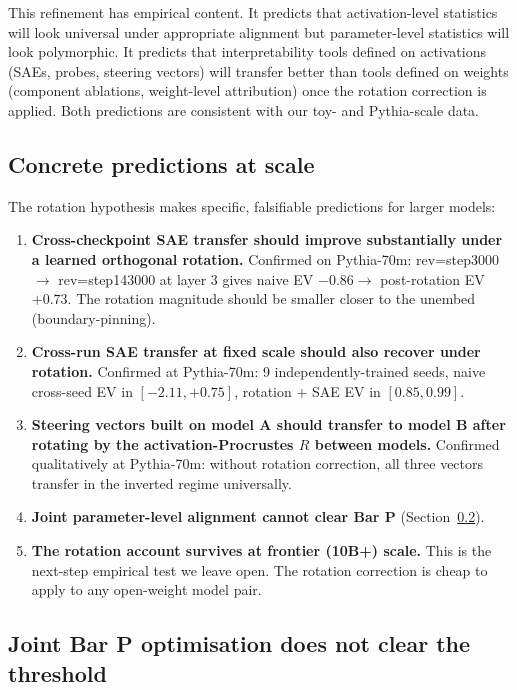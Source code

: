 \documentclass[11pt,letterpaper]{article}
\newcommand{\R}{R}
\begin{document}
This refinement has empirical content. It predicts that activation-level statistics will look universal under appropriate alignment but parameter-level statistics will look polymorphic. It predicts that interpretability tools defined on activations (SAEs, probes, steering vectors) will transfer better than tools defined on weights (component ablations, weight-level attribution) once the rotation correction is applied. Both predictions are consistent with our toy- and Pythia-scale data.

\subsection{Concrete predictions at scale}

The rotation hypothesis makes specific, falsifiable predictions for larger models:

\begin{enumerate}[itemsep=2pt,topsep=2pt]
\item \textbf{Cross-checkpoint SAE transfer should improve substantially under a learned orthogonal rotation.} Confirmed on Pythia-70m: rev=step3000 $\to$ rev=step143000 at layer 3 gives naive EV $-0.86 \to$ post-rotation EV $+0.73$. The rotation magnitude should be smaller closer to the unembed (boundary-pinning).
\item \textbf{Cross-run SAE transfer at fixed scale should also recover under rotation.} Confirmed at Pythia-70m: 9 independently-trained seeds, naive cross-seed EV in $[-2.11, +0.75]$, rotation $+$ SAE EV in $[0.85, 0.99]$.
\item \textbf{Steering vectors built on model A should transfer to model B after rotating by the activation-Procrustes $\R$ between models.} Confirmed qualitatively at Pythia-70m: without rotation correction, all three vectors transfer in the inverted regime universally.
\item \textbf{Joint parameter-level alignment cannot clear Bar P} (Section~\ref{sec:jointbarp}).
\item \textbf{The rotation account survives at frontier (10B+) scale.} This is the next-step empirical test we leave open. The rotation correction is cheap to apply to any open-weight model pair.
\end{enumerate}

\subsection{Joint Bar P optimisation does not clear the threshold}
\label{sec:jointbarp}
\end{document}
